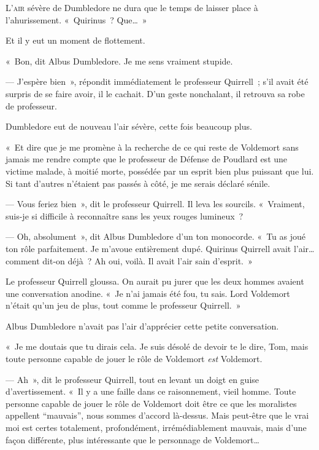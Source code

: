 
\lettrine{L}{'air} sévère de Dumbledore ne dura que le temps de laisser place à l'ahurissement.
«~Quirinus~?
Que…~»

Et il y eut un moment de flottement.

«~Bon, dit Albus Dumbledore.
Je me sens vraiment stupide.

--- J'espère bien~», répondit immédiatement le professeur Quirrell~; s'il avait été surpris de se faire avoir, il le cachait.
D'un geste nonchalant, il retrouva sa robe de professeur.

Dumbledore eut de nouveau l'air sévère, cette fois beaucoup plus.

«~Et dire que je me promène à la recherche de ce qui reste de Voldemort sans jamais me rendre compte que le professeur de Défense de Poudlard est une victime malade, à moitié morte, possédée par un esprit bien plus puissant que lui.
Si tant d'autres n'étaient pas passés à côté, je me serais déclaré sénile.

--- Vous feriez bien~», dit le professeur Quirrell.
Il leva les sourcils.
«~Vraiment, suis-je si difficile à reconnaître sans les yeux rouges lumineux~?

--- Oh, absolument~», dit Albus Dumbledore d'un ton monocorde.
«~Tu as joué ton rôle parfaitement.
Je m'avoue entièrement dupé.
Quirinus Quirrell avait l'air… comment dit-on déjà~?
Ah oui, voilà.
Il avait l'air sain d'esprit.~»

Le professeur Quirrell gloussa.
On aurait pu jurer que les deux hommes avaient une conversation anodine.
«~Je n'ai jamais été fou, tu sais.
Lord Voldemort n'était qu'un jeu de plus, tout comme le professeur Quirrell.~»

Albus Dumbledore n'avait pas l'air d'apprécier cette petite conversation.

«~Je me doutais que tu dirais cela.
Je suis désolé de devoir te le dire, Tom, mais toute personne capable de jouer le rôle de Voldemort \emph{est} Voldemort.

--- Ah~», dit le professeur Quirrell, tout en levant un doigt en guise d'avertissement.
«~Il y a une faille dans ce raisonnement, vieil homme.
Toute personne capable de jouer le rôle de Voldemort doit être ce que les moralistes appellent “mauvais”, nous sommes d'accord là-dessus.
Mais peut-être que le vrai moi est certes totalement, profondément, irrémédiablement mauvais, mais d'une façon différente, plus intéressante que le personnage de Voldemort…

